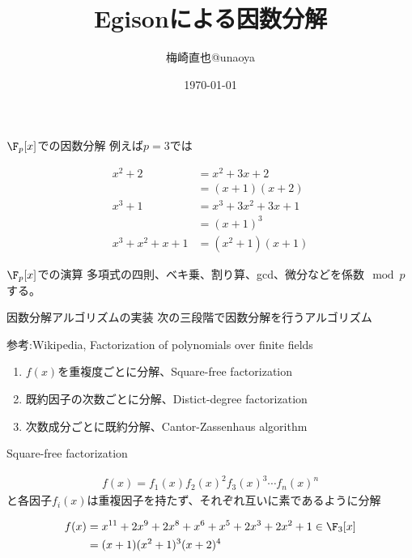 \documentclass[uplatex]{beamer}
\title{Egisonによる因数分解}
\author{梅崎直也@unaoya}
\date{\today}
\institute{株式会社すうがくぶんか}
\begin{document}
\begin{frame}
\maketitle
\end{frame}

\begin{frame}{$\F_p[x]$での因数分解}
例えば$p=3$では

\begin{align*}
x^2+2&=x^2+3x+2\\&=(x+1)(x+2)\\
x^3+1&=x^3+3x^2+3x+1\\&=(x+1)^3\\
x^3+x^2+x+1&=(x^2+1)(x+1)
\end{align*}
\end{frame}

\begin{frame}{$\F_p[x]$での演算}
多項式の四則、ベキ乗、割り算、gcd、微分などを係数$\mod p$する。
\end{frame}

\begin{frame}{因数分解アルゴリズムの実装}
次の三段階で因数分解を行うアルゴリズム

参考:Wikipedia, Factorization of polynomials over finite fields

\begin{enumerate}
\item $f(x)$を重複度ごとに分解、Square-free factorization
\item 既約因子の次数ごとに分解、Distict-degree factorization
\item 次数成分ごとに既約分解、Cantor-Zassenhaus algorithm
\end{enumerate}
\end{frame}

\begin{frame}{Square-free factorization}

\begin{align*}
f(x)=f_1(x)f_2(x)^2f_3(x)^3\cdots f_n(x)^n
\end{align*}
と各因子$f_i(x)$は重複因子を持たず、それぞれ互いに素であるように分解


\begin{align*}
f(x)&=x^{11}+2x^9+2x^8+x^6+x^5+2x^3+2x^2+1 \in \F_3[x]\\
&=(x+1)(x^2+1)^3(x+2)^4
\end{align*}
\end{frame}
\end{document}
